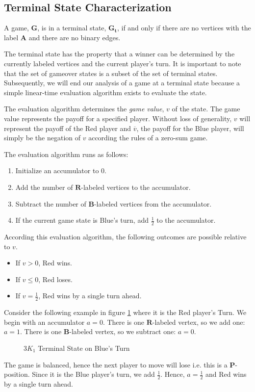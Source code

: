 \documentclass{sig-alternate}
\newcommand\ppos[0]{\textbf{P}}
\begin{document}
\subsection{Terminal State Characterization}

\begin{defn}
	A game, $\mathbf{G}$, is in a terminal state, $\mathbf{G_t}$, if and only
	if there are no vertices with the label $\mathbf{A}$ and there are no
	binary edges.
\end{defn}

The terminal state has the property that a winner can be determined by the
currently labeled vertices and the current player's turn. It is important to
note that the set of gameover states is a subset of the set of terminal states.
Subsequently, we will end our analysis of a game at a terminal state because a
simple linear-time evaluation algorithm exists to evaluate the state.

The evaluation algorithm determines the \emph{game value}, $v$ of the state.
The game value represents the payoff for a specified player. Without loss of
generality, $v$ will represent the payoff of the Red player and $\overline{v}$,
the payoff for the Blue player, will simply be the negation of $v$ according the
rules of a zero-sum game.

The evaluation algorithm runs as follows:
\begin{enumerate}
	\item Initialize an accumulator to $0$.
	\item Add the number of $\mathbf{R}$-labeled vertices to the accumulator.
	\item Subtract the number of $\mathbf{B}$-labeled vertices from the accumulator.
	\item If the current game state is Blue's turn, add $\frac{1}{2}$ to the accumulator.
\end{enumerate}

According this evaluation algorithm, the following outcomes are possible
relative to $v$.
\begin{itemize}
	\item If $v > 0$, Red wins.
	\item If $v \leq 0$, Red loses.
	\item If $v = \frac{1}{2}$, Red wins by a single turn ahead.
\end{itemize}

Consider the following example in figure \ref{fig:3K_1-Terminal} where it is
the Red player's Turn. We begin with an accumulator $a = 0$. There is one
$\mathbf{R}$-labeled vertex, so we add one: $a = 1$. There is one
$\mathbf{B}$-labeled vertex, so we subtract one: $a = 0$.
\begin{figure}[h]
	\label{fig:3K_1-Terminal}
	\centering
	\begin{tikzpicture}
	
	\end{tikzpicture}
	\caption{$3K_1$ Terminal State on Blue's Turn}
\end{figure}
The game is balanced, hence the next player to move will lose i.e. this is a
\ppos-position. Since it is the Blue player's turn, we add $\frac{1}{2}$.
Hence, $a = \frac{1}{2}$ and Red wins by a single turn ahead.
\end{document}
